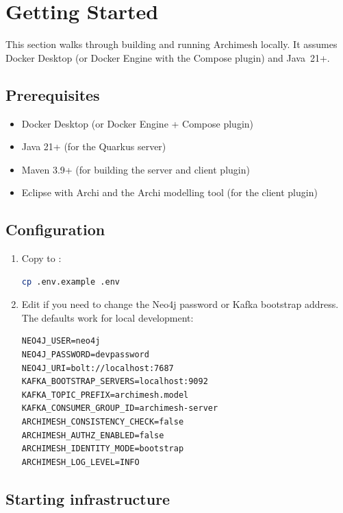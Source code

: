 \section{Getting Started}
\label{sec:GettingStarted}

This section walks through building and running Archimesh locally. It assumes
Docker Desktop (or Docker Engine with the Compose plugin) and Java~21+.

\subsection{Prerequisites}

\begin{itemize}
\item Docker Desktop (or Docker Engine + Compose plugin)
\item Java 21+ (for the Quarkus server)
\item Maven 3.9+ (for building the server and client plugin)
\item Eclipse with Archi and the Archi modelling tool (for the client plugin)
\end{itemize}

\subsection{Configuration}

\begin{enumerate}
\item Copy  to :
\begin{lstlisting}[language=bash,caption={Setup environment}]
cp .env.example .env
\end{lstlisting}

\item Edit  if you need to change the Neo4j password or Kafka
  bootstrap address. The defaults work for local development:
\begin{lstlisting}[caption={Default .env values}]
NEO4J_USER=neo4j
NEO4J_PASSWORD=devpassword
NEO4J_URI=bolt://localhost:7687
KAFKA_BOOTSTRAP_SERVERS=localhost:9092
KAFKA_TOPIC_PREFIX=archimesh.model
KAFKA_CONSUMER_GROUP_ID=archimesh-server
ARCHIMESH_CONSISTENCY_CHECK=false
ARCHIMESH_AUTHZ_ENABLED=false
ARCHIMESH_IDENTITY_MODE=bootstrap
ARCHIMESH_LOG_LEVEL=INFO
\end{lstlisting}
\end{enumerate}

\subsection{Starting infrastructure}

